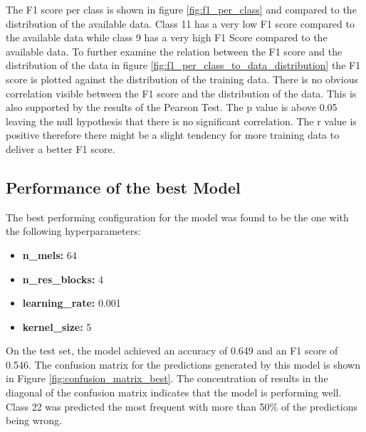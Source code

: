 The F1 score per class is shown in figure \ref{fig:f1_per_class} and compared to the distribution
of the available data. Class 11 has a very low F1 score compared to the available data while class 9 has a very high F1 Score
compared to the available data. To further examine the relation between the F1 score and the distribution of the data
in figure \ref{fig:f1_per_class_to_data_distribution} the F1 score is plotted against the distribution of the training data.
There is no obvious correlation visible between the F1 score and the distribution of the data. This is also supported by the results
of the Pearson Test. The p value is above 0.05 leaving the null hypothesis that there is no significant correlation. The r value
is positive therefore there might be a slight tendency for more training data to deliver a better F1 score.










\subsection{Performance of the best Model}%

The best performing configuration for the model was found to be the one with the following hyperparameters:

\begin{itemize}
    \item \textbf{n\_mels:} 64
    \item \textbf{n\_res\_blocks:} 4
    \item \textbf{learning\_rate:} 0.001
    \item \textbf{kernel\_size:} 5
\end{itemize}

On the test set, the model achieved an accuracy of 0.649 and an F1 score of 0.546. 
The confusion matrix for the predictions generated by this model is shown in Figure \ref{fig:confusion_matrix_best}.
The concentration of results in the diagonal of the confusion matrix indicates that the model is performing well.
Class 22 was predicted the most frequent with more than 50\% of the predictions being wrong.


